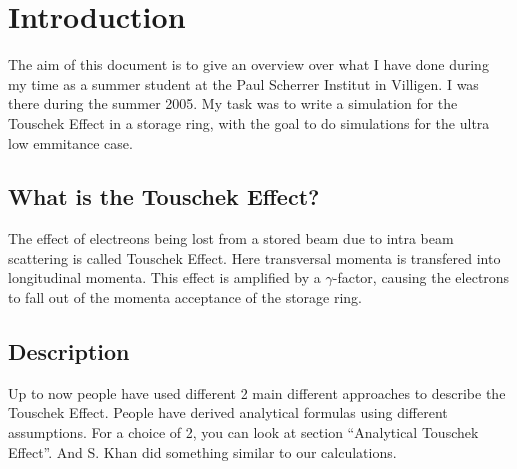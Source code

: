 \section{Introduction}
The aim of this document is to give an overview over what I have done during my time as a summer student at the Paul Scherrer Institut in Villigen. I was there during the summer 2005. My task was to write a simulation for the Touschek Effect in a storage ring, with the goal to do simulations for the ultra low emmitance case.
\subsection{What is the Touschek Effect?}
The effect of electreons being lost from a stored beam due to intra beam scattering is called Touschek Effect. Here transversal momenta is transfered into longitudinal momenta. This effect is amplified by a $\gamma$-factor, causing the electrons to fall out of the momenta acceptance of the storage ring.
\subsection{Description}
Up to now people have used different 2 main different approaches to describe the Touschek Effect. People have derived analytical formulas using different assumptions. For a choice of 2, you can look at section ``Analytical Touschek Effect''. And S. Khan did something similar to our calculations.
